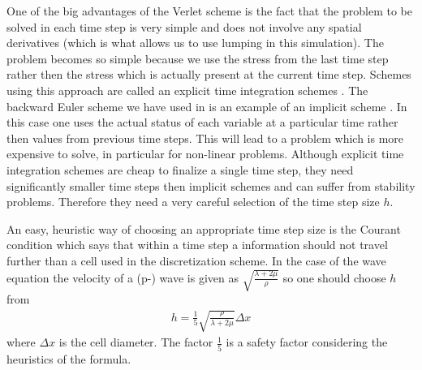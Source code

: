 One of the big advantages of the Verlet scheme is the fact that the problem to be solved 
in each time step is very simple and does not involve any spatial derivatives (which is what allows us to use lumping in this simulation).
The problem becomes so simple because we use the stress from the last time step rather then the stress which is
actually present at the current time step. Schemes using this approach are called an explicit time integration 
schemes  . The 
backward Euler scheme we have used in  is 
an example of an implicit scheme
 . In this case one uses the actual status of 
each variable at a particular time rather then values from previous time steps. This will lead to a problem which is 
more expensive to solve, in particular for non-linear problems. 
Although 
explicit time integration schemes are cheap to finalize a single time step, they need significantly smaller time
steps then implicit schemes and can suffer from stability problems. Therefore they need a 
very careful selection of the time step size $h$.

An easy, heuristic way of choosing an appropriate
time step size is the Courant condition  
which says that within a time step a information should not travel further than a cell used in the 
discretization scheme. In the case of the wave equation the velocity of a (p-) wave is given as
$\sqrt{\frac{\lambda+2\mu}{\rho}}$ so one should choose $h$ from
\begin{eqnarray}\label{WAVE dyn 66}
h= \frac{1}{5} \sqrt{\frac{\rho}{\lambda+2\mu}} \Delta x
\end{eqnarray}
where $\Delta x$ is the cell diameter. The factor $\frac{1}{5}$ is a safety factor considering the heuristics of 
the formula.


